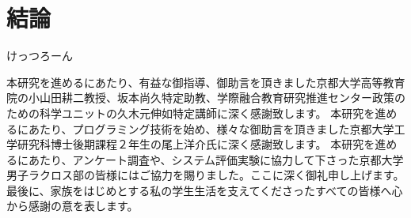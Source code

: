 \documentclass[sotsuron]{kuee}
\begin{document}
\chapter{結論}
けっつろーん


\begin{acknowledgements}
	本研究を進めるにあたり、有益な御指導、御助言を頂きました京都大学高等教育院の小山田耕二教授、坂本尚久特定助教、学際融合教育研究推進センター政策のための科学ユニットの久木元伸如特定講師に深く感謝致します。
	本研究を進めるにあたり、プログラミング技術を始め、様々な御助言を頂きました京都大学工学研究科博士後期課程２年生の尾上洋介氏に深く感謝致します。
	本研究を進めるにあたり、アンケート調査や、システム評価実験に協力して下さった京都大学男子ラクロス部の皆様にはご協力を賜りました。ここに深く御礼申し上げます。
	最後に、家族をはじめとする私の学生生活を支えてくださったすべての皆様へ心から感謝の意を表します。
\end{acknowledgements}








\appendix
\end{document}
